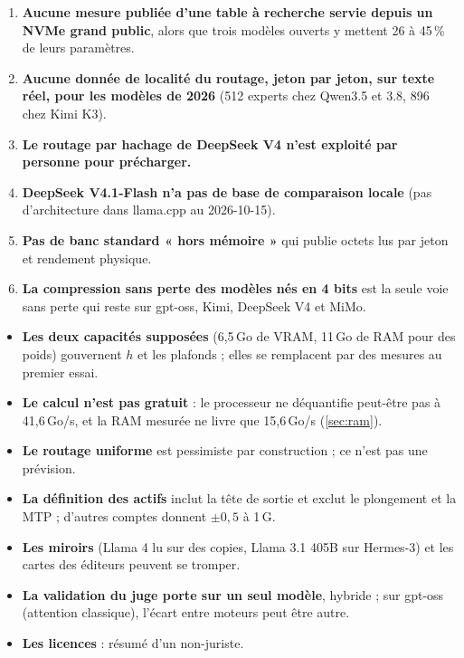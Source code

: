 \begin{enumerate}
\item \textbf{Aucune mesure publiée d'une table à recherche servie depuis un NVMe grand public}, alors que trois modèles ouverts y mettent 26 à 45\,\% de leurs paramètres.
\item \textbf{Aucune donnée de localité du routage, jeton par jeton, sur texte réel, pour les modèles de 2026} (512 experts chez Qwen3.5 et 3.8, 896 chez Kimi K3).
\item \textbf{Le routage par hachage de DeepSeek V4 n'est exploité par personne pour précharger.}
\item \textbf{DeepSeek V4.1-Flash n'a pas de base de comparaison locale} (pas d'architecture dans llama.cpp au 2026-10-15).
\item \textbf{Pas de banc standard « hors mémoire »} qui publie octets lus par jeton et rendement physique.
\item \textbf{La compression sans perte des modèles nés en 4 bits} est la seule voie sans perte qui reste sur gpt-oss, Kimi, DeepSeek V4 et MiMo.
\end{enumerate}

\begin{faux}
\begin{itemize}
\item \textbf{Les deux capacités supposées} (6,5\,Go de VRAM, 11\,Go de RAM pour des poids) gouvernent $h$ et les plafonds ; elles se remplacent par des mesures au premier essai.
\item \textbf{Le calcul n'est pas gratuit} : le processeur ne déquantifie peut-être pas à 41,6\,Go/s, et la RAM mesurée ne livre que 15,6\,Go/s (\cref{sec:ram}).
\item \textbf{Le routage uniforme} est pessimiste par construction ; ce n'est pas une prévision.
\item \textbf{La définition des actifs} inclut la tête de sortie et exclut le plongement et la MTP ; d'autres comptes donnent $\pm 0{,}5$ à 1\,G.
\item \textbf{Les miroirs} (Llama 4 lu sur des copies, Llama 3.1 405B sur Hermes-3) et les cartes des éditeurs peuvent se tromper.
\item \textbf{La validation du juge porte sur un seul modèle}, hybride ; sur gpt-oss (attention classique), l'écart entre moteurs peut être autre.
\item \textbf{Les licences} : résumé d'un non-juriste.
\end{itemize}
\end{faux}
